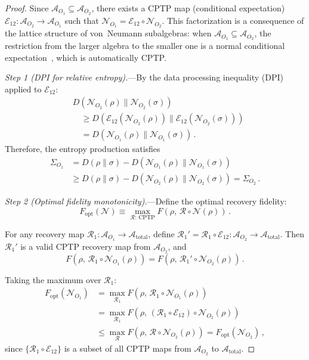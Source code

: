 \documentclass[aps,prd,preprint,superscriptaddress,longbibliography]{revtex4-2}
\newcommand{\Petz}{\mathcal{R}}
\newcommand{\chan}{\mathcal{N}}
\newcommand{\algO}{\mathcal{A}}
\begin{document}
\begin{proof}
Since $\algO_{O_1} \subseteq \algO_{O_2}$, there exists a CPTP map
(conditional expectation) $\mathcal{E}_{12}: \algO_{O_2} \to \algO_{O_1}$
such that $\chan_{O_1} = \mathcal{E}_{12} \circ \chan_{O_2}$.  This
factorization is a consequence of the lattice structure of von~Neumann
subalgebras: when $\algO_{O_1} \subseteq \algO_{O_2}$, the restriction
from the larger algebra to the smaller one is a normal conditional
expectation~\cite{Takesaki1972}, which is automatically CPTP.

\emph{Step 1 (DPI for relative entropy).}---By the data processing
inequality (DPI) applied to $\mathcal{E}_{12}$:
\begin{align}
  &D(\chan_{O_2}(\rho)\|\chan_{O_2}(\sigma))
  \nonumber\\
  &\quad\geq D(\mathcal{E}_{12}(\chan_{O_2}(\rho))\|
  \mathcal{E}_{12}(\chan_{O_2}(\sigma)))
  \nonumber\\
  &\quad= D(\chan_{O_1}(\rho)\|\chan_{O_1}(\sigma))\,.
  \label{eq:DPI_step}
\end{align}
Therefore, the entropy production satisfies
\begin{align}
  \Sigma_{O_1} &= D(\rho\|\sigma) - D(\chan_{O_1}(\rho)\|\chan_{O_1}(\sigma))
  \nonumber\\
  &\geq D(\rho\|\sigma) - D(\chan_{O_2}(\rho)\|\chan_{O_2}(\sigma))
  = \Sigma_{O_2}\,.
  \label{eq:Sigma_mono}
\end{align}

\emph{Step 2 (Optimal fidelity monotonicity).}---Define the optimal
recovery fidelity:
\begin{equation}
  F_{\mathrm{opt}}(\chan) \equiv \max_{\Petz:\,\text{CPTP}}
  F(\rho,\,\Petz \circ \chan(\rho))\,.
  \label{eq:Fopt_def}
\end{equation}

For any recovery map $\Petz_1: \algO_{O_1} \to \algO_{\mathrm{total}}$,
define $\Petz_1' = \Petz_1 \circ \mathcal{E}_{12}: \algO_{O_2} \to
\algO_{\mathrm{total}}$.  Then $\Petz_1'$ is a valid CPTP recovery map
from $\algO_{O_2}$, and
\begin{equation}
  F(\rho,\,\Petz_1 \circ \chan_{O_1}(\rho))
  = F(\rho,\,\Petz_1' \circ \chan_{O_2}(\rho))\,.
  \label{eq:F_embed}
\end{equation}

Taking the maximum over $\Petz_1$:
\begin{align}
  F_{\mathrm{opt}}(\chan_{O_1})
  &= \max_{\Petz_1} F(\rho,\,\Petz_1 \circ \chan_{O_1}(\rho))
  \nonumber\\
  &= \max_{\Petz_1} F(\rho,\,(\Petz_1 \circ \mathcal{E}_{12})
    \circ \chan_{O_2}(\rho))
  \nonumber\\
  &\leq \max_{\Petz} F(\rho,\,\Petz \circ \chan_{O_2}(\rho))
  = F_{\mathrm{opt}}(\chan_{O_2})\,,
  \label{eq:Fopt_mono}
\end{align}
since $\{\Petz_1 \circ \mathcal{E}_{12}\}$ is a subset of all CPTP
maps from $\algO_{O_2}$ to $\algO_{\mathrm{total}}$.


\end{proof}
\end{document}
